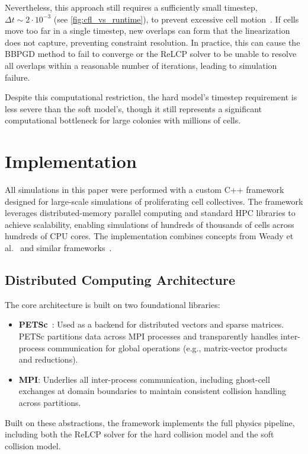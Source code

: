 \documentclass[conference]{IEEEtran}
\begin{document}
Nevertheless, this approach still requires a sufficiently small timestep, $\Delta t \sim 2 \cdot 10^{-3}$ (see \autoref{fig:cfl_vs_runtime}), to prevent excessive cell motion~\cite{Yan2022}. If cells move too far in a single timestep, new overlaps can form that the linearization does not capture, preventing constraint resolution. In practice, this can cause the BBPGD method to fail to converge or the ReLCP solver to be unable to resolve all overlaps within a reasonable number of iterations, leading to simulation failure.

Despite this computational restriction, the hard model's timestep requirement is less severe than the soft model's, though it still represents a significant computational bottleneck for large colonies with millions of cells.

\section{Implementation}

All simulations in this paper were performed with a custom C++ framework designed for large-scale simulations of proliferating cell collectives. The framework leverages distributed-memory parallel computing and standard HPC libraries to achieve scalability, enabling simulations of hundreds of thousands of cells across hundreds of CPU cores. The implementation combines concepts from Weady et al.~\cite{Weady2024SM} and similar frameworks~\cite{Tasora2008,Yan2019}.

\subsection{Distributed Computing Architecture}

The core architecture is built on two foundational libraries:
\begin{itemize}
    \item \textbf{PETSc}~\cite{petsc-web-page}: Used as a backend for distributed vectors and sparse matrices. PETSc partitions data across MPI processes and transparently handles inter-process communication for global operations (e.g., matrix-vector products and reductions).
    \item \textbf{MPI}: Underlies all inter-process communication, including ghost-cell exchanges at domain boundaries to maintain consistent collision handling across partitions.
\end{itemize}

Built on these abstractions, the framework implements the full physics pipeline, including both the ReLCP solver for the hard collision model and the soft collision model.
\end{document}
